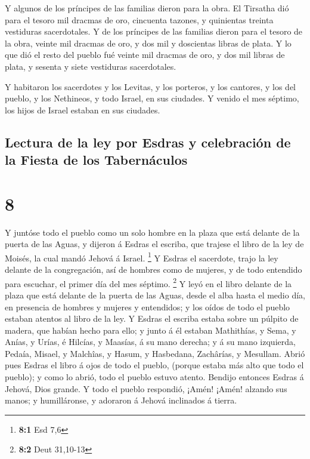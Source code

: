  Y algunos de los príncipes de las familias dieron para
la obra. El Tirsatha dió para el tesoro mil dracmas de oro, cincuenta
tazones, y quinientas treinta vestiduras sacerdotales.  Y
de los príncipes de las familias dieron para el tesoro de la obra,
veinte mil dracmas de oro, y dos mil y doscientas libras de plata.
 Y lo que dió el resto del pueblo fué veinte mil dracmas
de oro, y dos mil libras de plata, y sesenta y siete vestiduras
sacerdotales.

 Y habitaron los sacerdotes y los Levitas, y los
porteros, y los cantores, y los del pueblo, y los Nethineos, y todo
Israel, en sus ciudades. Y venido el mes séptimo, los hijos de Israel
estaban en sus ciudades.

\hypertarget{lectura-de-la-ley-por-esdras-y-celebraciuxf3n-de-la-fiesta-de-los-tabernuxe1culos}{%
\subsection{Lectura de la ley por Esdras y celebración de la Fiesta de
los
Tabernáculos}\label{lectura-de-la-ley-por-esdras-y-celebraciuxf3n-de-la-fiesta-de-los-tabernuxe1culos}}

\hypertarget{section-7}{%
\section{8}\label{section-7}}

 Y juntóse todo el pueblo como un solo hombre en la plaza
que está delante de la puerta de las Aguas, y dijeron á Esdras el
escriba, que trajese el libro de la ley de Moisés, la cual mandó Jehová
á Israel. \footnote{\textbf{8:1} Esd 7,6}  Y Esdras el
sacerdote, trajo la ley delante de la congregación, así de hombres como
de mujeres, y de todo entendido para escuchar, el primer día del mes
séptimo. \footnote{\textbf{8:2} Deut 31,10-13}  Y leyó en
el libro delante de la plaza que está delante de la puerta de las Aguas,
desde el alba hasta el medio día, en presencia de hombres y mujeres y
entendidos; y los oídos de todo el pueblo estaban atentos al libro de la
ley.  Y Esdras el escriba estaba sobre un púlpito de
madera, que habían hecho para ello; y junto á él estaban Mathithías, y
Sema, y Anías, y Urías, é Hilcías, y Maasías, á su mano derecha; y á su
mano izquierda, Pedaía, Misael, y Malchîas, y Hasum, y Hasbedana,
Zachârías, y Mesullam.  Abrió pues Esdras el libro á ojos
de todo el pueblo, (porque estaba más alto que todo el pueblo); y como
lo abrió, todo el pueblo estuvo atento.  Bendijo entonces
Esdras á Jehová, Dios grande. Y todo el pueblo respondió, ¡Amén! ¡Amén!
alzando sus manos; y humilláronse, y adoraron á Jehová inclinados á
tierra.


